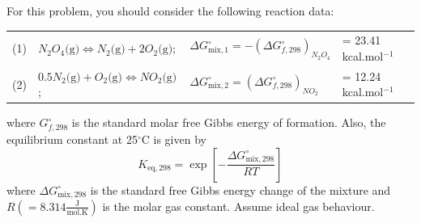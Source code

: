 \documentclass[calculator,steamtables,allquestions,datasheet]{exam_newMarcus2}
\newcommand{\frc}{\displaystyle\frac}
\begin{document}
\begin{question}
        For this problem, you should consider the following reaction data:   
       \begin{center}
          \begin{tabular}{c l l l}
             (1) &$N_{2}O_{4}\text{(g)}\Leftrightarrow N_{2}\text{(g)} + 2O_{2}\text{(g)}$; & $\Delta G^{\circ}_{\text{mix},1} = -\left(\Delta G^{\circ}_{f,298}\right)_{N_{2}O_{4}}$ & =  23.41 kcal.mol$^{-1}$  \\
             (2) & $0.5N_{2}\text{(g)}+O_{2}\text{(g)}\Leftrightarrow NO_{2}\text{(g)}$; & $\Delta G^{\circ}_{\text{mix},2} = \left(\Delta G^{\circ}_{f,298}\right)_{NO_{2}}$ & = 12.24 kcal.mol$^{-1}$ 
          \end{tabular}
       \end{center}
          where $G^{\circ}_{f,298}$ is the standard molar free Gibbs energy of formation. Also, the equilibrium constant at 25$^{\circ}$C is given by
          \begin{displaymath}
              K_{\text{eq},298} = \exp{\left[-\frc{\Delta G^{\circ}_{\text{mix},298}}{R T}\right]}
          \end{displaymath}
          where $\Delta G^{\circ}_{\text{mix},298}$ is the standard free Gibbs energy change of the mixture and $R\left(=8.314\frc{\text{J}}{\text{mol.K}}\right)$ is the molar gas constant. Assume ideal gas behaviour.
%
\end{question}

\clearpage
\end{document}
